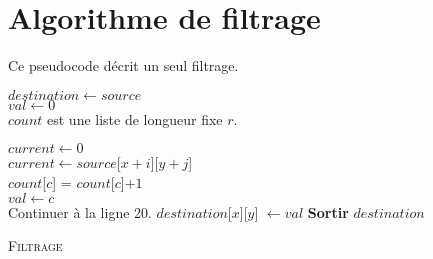 \documentclass[a4paper, 11pt]{article}
\begin{document}
\section*{Algorithme de filtrage}
Ce pseudocode décrit un seul filtrage.\\
\begin{algorithm}[H]
\SetSideCommentLeft
    
    $destination \gets source$\\
    $val \gets 0$\\
    $count$ est une liste de longueur fixe $r$.
    
      	  {
      	    {
    			$current \gets 0$\\
   				  {
   				  	  {
   				  	  	  {
   				  	  	    $current \gets source$[$x + i$][$y + j$]\\
   				  	  	  	  {
   				  	  	  	  		{
   				  	  	  	  			$count$[$c$] = $count$[$c$]$ + 1$\\
   				  	  	  	  			  {
   				  	  	  	  			    $val \gets c$\\
   				  	  	  	  			    Continuer à la ligne 20.   
   				  	  	  	  			  }
   				  	  	  	  		}
   				  	  	  	  }
   				  	  	  }
   				  	  }
   				  }
             $destination$[$x$][$y$] $\gets val$
      	    }
      	  }
       \textbf{Sortir} $destination$
\caption{ \textsc{Filtrage}}
\end{algorithm}
\end{document}
